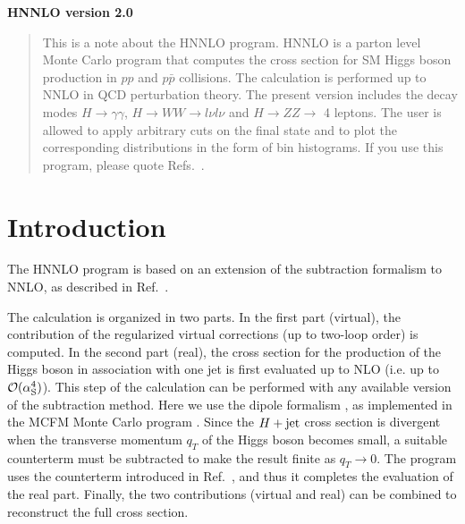 \documentclass[12pt]{article}
\newcommand\as{\alpha_{\mathrm{S}}}
\begin{document}
\vspace*{1cm}
\begin{center}
{\Large \bf HNNLO version 2.0}
\end{center}
\par \vspace{2mm}
\begin{center}


\vspace{12mm}



\begin{quote}

This is a note about the HNNLO program.
HNNLO is a parton level Monte Carlo program
that computes the cross section for 
SM Higgs boson production in $pp$ and $p{\bar p}$ collisions.
The calculation is performed
up to NNLO in QCD perturbation theory.
The present version includes the decay modes
$H\to \gamma\gamma$, $H\to WW\to l\nu l\nu$ and $H\to ZZ\to$ 4 leptons.
The user is allowed to apply arbitrary cuts on the final state and to plot the corresponding distributions in the form of bin histograms.
If you use this program, please quote
Refs.~\cite{Catani:2007vq,Grazzini:2008tf,Grazzini:2013mca}.


\end{quote}
\end{center}

\section{Introduction}

The HNNLO program is based on an extension of the subtraction formalism to NNLO,
as described in Ref.~\cite{Catani:2007vq}.

The calculation is organized in two parts. In the first part (virtual), the contribution of the regularized virtual corrections (up to two-loop order) is computed.
In the second part (real), the cross section for the production of 
the Higgs boson in association with one jet is first evaluated up to NLO (i.e. up to ${\cal O}(\as^4)$).
This step of the calculation can be performed with any available version of the subtraction method.
Here we use the dipole formalism \cite{Catani:1996jh}, as implemented in the MCFM Monte Carlo program \cite{mcfm}.
Since the $H+{\rm jet}$ cross section is divergent when the transverse momentum $q_T$ of
the Higgs boson becomes small, a suitable counterterm must be subtracted
to make the result finite as $q_T\to 0$.
The program uses the counterterm introduced in Ref.~\cite{Catani:2007vq},
and thus it completes the evaluation of the real part.
Finally, the two contributions (virtual and real) can be combined to reconstruct the full cross section.
\end{document}
